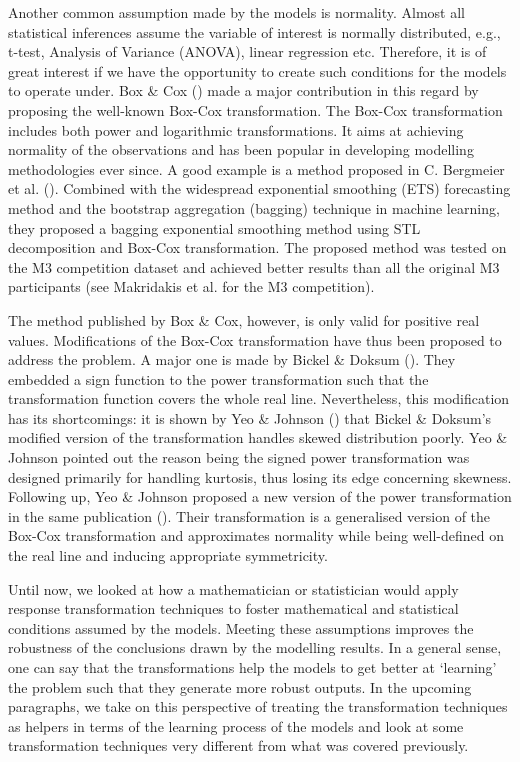 Another common assumption made by the models is normality. Almost all statistical inferences assume the variable of interest is normally distributed, e.g., t-test, Analysis of Variance (ANOVA), linear regression etc. Therefore, it is of great interest if we have the opportunity to create such conditions for the models to operate under. Box \& Cox (\citeyear{box1964analysis}) made a major contribution in this regard by proposing the well-known Box-Cox transformation. The Box-Cox transformation includes both power and logarithmic transformations. It aims at achieving normality of the observations and has been popular in developing modelling methodologies ever since. A good example is a method proposed in C. Bergmeier et al. (\citeyear{bergmeir2016bagging}). Combined with the widespread exponential smoothing (ETS) forecasting method and the bootstrap aggregation (bagging) technique in machine learning, they proposed a bagging exponential smoothing method using STL decomposition and Box-Cox transformation. The proposed method was tested on the M3 competition dataset and achieved better results than all the original M3 participants (see Makridakis et al. \citeyear{makridakis2000m3} for the M3 competition).

The method published by Box \& Cox, however, is only valid for positive real values. Modifications of the Box-Cox transformation have thus been proposed to address the problem. A major one is made by Bickel \& Doksum (\citeyear{bickel1981analysis}). They embedded a sign function to the power transformation such that the transformation function covers the whole real line. Nevertheless, this modification has its shortcomings: it is shown by Yeo \& Johnson (\citeyear{10.1093/Biomet/87.4.954}) that Bickel \& Doksum's modified version of the transformation handles skewed distribution poorly. Yeo \& Johnson pointed out the reason being the signed power transformation was designed primarily for handling kurtosis, thus losing its edge concerning skewness. Following up, Yeo \& Johnson proposed a new version of the power transformation in the same publication (\citeyear{10.1093/Biomet/87.4.954}). Their transformation is a generalised version of the Box-Cox transformation and approximates normality while being well-defined on the real line and inducing appropriate symmetricity.

Until now, we looked at how a mathematician or statistician would apply response transformation techniques to foster mathematical and statistical conditions assumed by the models. Meeting these assumptions improves the robustness of the conclusions drawn by the modelling results. In a general sense, one can say that the transformations help the models to get better at `learning' the problem such that they generate more robust outputs. In the upcoming paragraphs, we take on this perspective of treating the transformation techniques as helpers in terms of the learning process of the models and look at some transformation techniques very different from what was covered previously.

